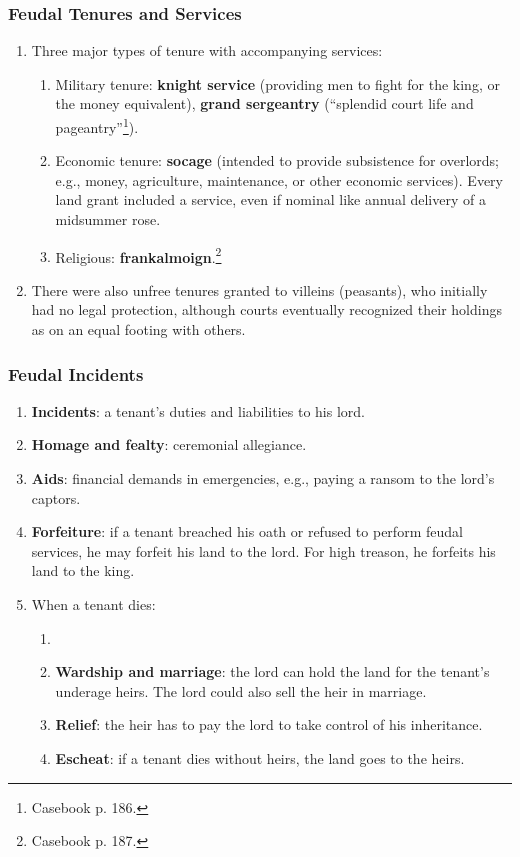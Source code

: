 \subsubsection{Feudal Tenures and Services}

\begin{enumerate}
    \item Three major types of tenure with accompanying services:
    \begin{enumerate}
        \item Military tenure: \textbf{knight service} (providing men to fight 
        for the king, or the money equivalent), \textbf{grand sergeantry} 
        (``splendid court life and pageantry''\footnote{Casebook p. 186.}).
        \item Economic tenure: \textbf{socage} (intended to provide 
        subsistence for overlords; e.g., money, agriculture, maintenance, or 
        other economic services). Every land grant included a service, even if 
        nominal like annual delivery of a midsummer rose.
        \item Religious: \textbf{frankalmoign}.\footnote{Casebook p. 187.}
    \end{enumerate}
    \item There were also unfree tenures granted to villeins (peasants), who 
    initially had no legal protection, although courts eventually recognized 
    their holdings as on an equal footing with others.
\end{enumerate}

\subsubsection{Feudal Incidents}

\begin{enumerate}
    \item \textbf{Incidents}: a tenant's duties and liabilities to his lord.
    \item \textbf{Homage and fealty}: ceremonial allegiance.
    \item \textbf{Aids}: financial demands in emergencies, e.g., paying a 
    ransom to the lord's captors.
    \item \textbf{Forfeiture}: if a tenant breached his oath or refused to 
    perform feudal services, he may forfeit his land to the lord. For high 
    treason, he forfeits his land to the king.
    \item When a tenant dies:
    \begin{enumerate}
        \item 
        \item \textbf{Wardship and marriage}: the lord can 
        hold the land for the tenant's underage heirs. The lord could also 
        sell the heir in marriage.
        \item \textbf{Relief}: the heir has to pay the lord to take control of 
        his inheritance.
        \item \textbf{Escheat}: if a tenant dies without heirs, the land goes 
        to the heirs. 
    \end{enumerate}
\end{enumerate}

